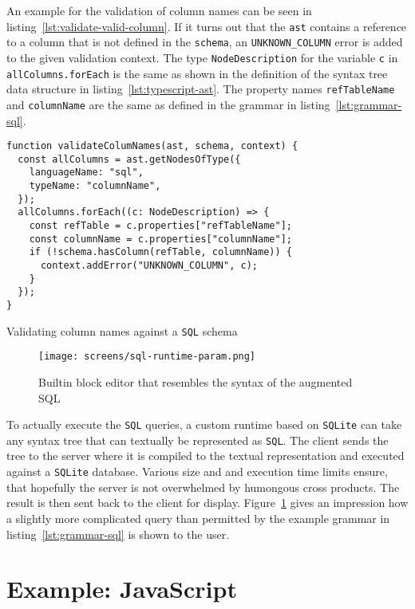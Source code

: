 \documentclass[sigconf,natbib=false,review=true,anonymous]{acmart}
\begin{document}
An example for the validation of column names can be seen in listing~\ref{lst:validate-valid-column}. If it turns out that the \texttt{ast} contains a reference to a column that is not defined in the \texttt{schema}, an \texttt{UNKNOWN\_COLUMN} error is added to the given validation context. The type \texttt{NodeDescription} for the variable \texttt{c} in \texttt{allColumns.forEach} is the same as shown in the definition of the syntax tree data structure in listing~\ref{lst:typescript-ast}. The property names \texttt{refTableName} and \texttt{columnName} are the same as defined in the grammar in listing~\ref{lst:grammar-sql}.

\begin{listing}[H]
\begin{verbatim}
function validateColumNames(ast, schema, context) {
  const allColumns = ast.getNodesOfType({
    languageName: "sql",
    typeName: "columnName",
  });
  allColumns.forEach((c: NodeDescription) => {
    const refTable = c.properties["refTableName"];
    const columnName = c.properties["columnName"];
    if (!schema.hasColumn(refTable, columnName)) {
      context.addError("UNKNOWN_COLUMN", c);
    }
  });
}
\end{verbatim}
\caption{Validating column names against a \texttt{SQL} schema}
\label{lst:validate-valid-column}
\end{listing}

\begin{figure}
  \texttt{[image: screens/sql-runtime-param.png]}
  \caption{Builtin block editor that resembles the syntax of the augmented SQL}
  \label{fig:sql-runtime}
\end{figure}

To actually execute the \texttt{SQL} queries, a custom runtime based on \texttt{SQLite} can take any syntax tree that can textually be represented as \texttt{SQL}. The client sends the tree to the server where it is compiled to the textual representation and executed against a \texttt{SQLite} database. Various size and and execution time limits ensure, that hopefully the server is not overwhelmed by humongous cross products. The result is then sent back to the client for display. Figure~\ref{fig:sql-runtime} gives an impression how a slightly more complicated query than permitted by the example grammar in listing~\ref{lst:grammar-sql} is shown to the user.

\section{Example: JavaScript}
\end{document}
